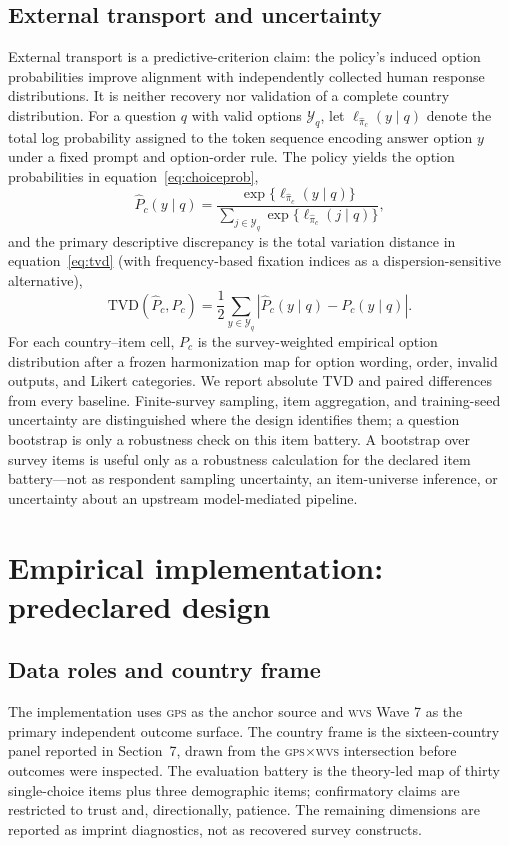 \documentclass[10pt,letterpaper]{article}
\newcommand{\WVS}{\textsc{wvs}}
\newcommand{\GPS}{\textsc{gps}}
\begin{document}
\subsection{External transport and uncertainty}
External transport is a predictive-criterion claim: the policy's induced option probabilities improve alignment with independently collected human response distributions. It is neither recovery nor validation of a complete country distribution. For a question $q$ with valid options $\mathcal{Y}_q$, let $\ell_{\widehat\pi_c}(y\mid q)$ denote the total log probability assigned to the token sequence encoding answer option $y$ under a fixed prompt and option-order rule. The policy yields the option probabilities in equation~\eqref{eq:choiceprob},
\begin{equation}
\widehat P_c(y\mid q)=\frac{\exp\{\ell_{\widehat\pi_c}(y\mid q)\}}{\sum_{j\in\mathcal{Y}_q}\exp\{\ell_{\widehat\pi_c}(j\mid q)\}},
\label{eq:choiceprob}
\end{equation}
and the primary descriptive discrepancy is the total variation distance in equation~\eqref{eq:tvd} (with frequency-based fixation indices \cite{muthukrishna2020} as a dispersion-sensitive alternative),
\begin{equation}
\mathrm{TVD}(\widehat P_c,P_c)=\frac{1}{2}\sum_{y\in\mathcal{Y}_q}|\widehat P_c(y\mid q)-P_c(y\mid q)|.
\label{eq:tvd}
\end{equation}
For each country--item cell, $P_c$ is the survey-weighted empirical option distribution after a frozen harmonization map for option wording, order, invalid outputs, and Likert categories. We report absolute TVD and paired differences from every baseline. Finite-survey sampling, item aggregation, and training-seed uncertainty are distinguished where the design identifies them; a question bootstrap is only a robustness check on this item battery. A bootstrap over survey items is useful only as a robustness calculation for the declared item battery---not as respondent sampling uncertainty, an item-universe inference, or uncertainty about an upstream model-mediated pipeline.

\section{Empirical implementation: predeclared design}
\subsection{Data roles and country frame}
The implementation uses \GPS{} as the anchor source and \WVS{} Wave 7 as the primary independent outcome surface. The country frame is the sixteen-country panel reported in Section~7, drawn from the \GPS{}$\times$\WVS{} intersection before outcomes were inspected. The evaluation battery is the theory-led map of thirty single-choice items plus three demographic items; confirmatory claims are restricted to trust and, directionally, patience. The remaining dimensions are reported as imprint diagnostics, not as recovered survey constructs.
\end{document}
